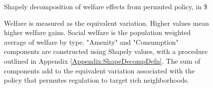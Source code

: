 \documentclass[12pt]{article}
\begin{document}
	\begin{figure}[htbp!]
		
		\caption{Shapely decomposition of welfare effects from permuted policy, in \$}\label{figure:WelfareDecomp_optPolicy_nopercent}
		
		\caption*{Welfare is measured as the equivalent variation. Higher values mean higher welfare gains. Social welfare is the population weighted average of welfare by type. "Amenity" and "Consumption" components are constructed using Shapely values, with a procedure outlined in Appendix \ref{Appendix:ShapeDecompDefn}. The sum of components add to the equivalent variation associated with the policy that permutes regulation to target rich neighborhoods.}
		
	\end{figure}
	
\end{document}
